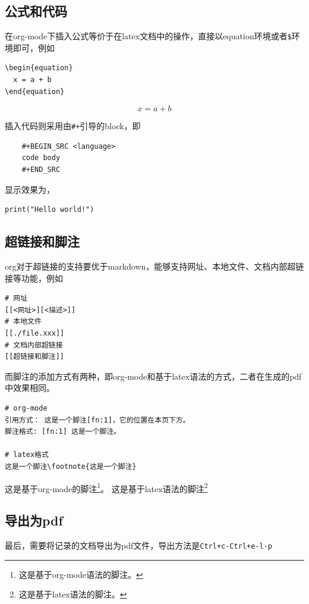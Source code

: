 \documentclass[11pt]{article}
\begin{document}
\subsection{公式和代码}
\label{sec:org7cd612a}
在org-mode下插入公式等价于在latex文档中的操作，直接以equation环境或者\texttt{\$}环境即可，例如
\begin{verbatim}
\begin{equation}
  x = a + b
\end{equation}
\end{verbatim}

\begin{equation}
x = a + b
\end{equation}

插入代码则采用由\texttt{\#+}引导的block，即
\begin{verbatim}
	#+BEGIN_SRC <language>
	code body
	#+END_SRC
\end{verbatim}

显示效果为，
\begin{verbatim}
print("Hello world!")
\end{verbatim}

\subsection{超链接和脚注}
\label{sec:orgbc815af}
org对于超链接的支持要优于markdown，能够支持网址、本地文件、文档内部超链接等功能，例如
\begin{verbatim}
# 网址
[[<网址>][<描述>]]
# 本地文件
[[./file.xxx]]
# 文档内部超链接
[[超链接和脚注]]
\end{verbatim}
而脚注的添加方式有两种，即org-mode和基于latex语法的方式，二者在生成的pdf中效果相同。

\begin{verbatim}
# org-mode
引用方式： 这是一个脚注[fn:1]，它的位置在本页下方。
脚注格式: [fn:1] 这是一个脚注。

# latex格式
这是一个脚注\footnote{这是一个脚注}
\end{verbatim}

这是基于org-mode的脚注\footnote{这是基于org-mode语法的脚注。}。
这是基于latex语法的脚注\footnote{这是基于latex语法的脚注。}

\subsection{导出为pdf}
\label{sec:org819e529}
最后，需要将记录的文档导出为pdf文件，导出方法是\texttt{Ctrl+c-Ctrl+e-l-p}
\end{document}
